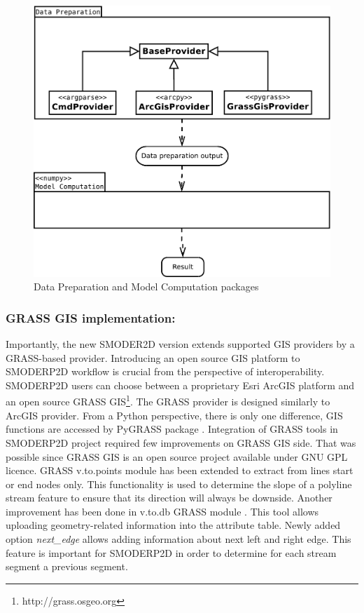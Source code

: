 \begin{figure}[ht!]
  \begin{center}
    \includegraphics[width=1.0\columnwidth]{figures/uml_diagram.pdf}
    \caption{Data Preparation and Model Computation packages}
    \label{fig:uml_diagram}
  \end{center}
\end{figure}

\subsubsection{GRASS GIS implementation:}
Importantly, the new SMODER2D version extends supported GIS providers
by a GRASS-based provider. Introducing an open source GIS platform to
SMODERP2D workflow is crucial from the perspective of
interoperability. SMODERP2D users can choose between a proprietary
Esri ArcGIS platform and an open source GRASS
GIS\footnote{http://grass.osgeo.org}. The GRASS provider is designed
similarly to ArcGIS provider. From a Python perspective, there is only
one difference, GIS functions are accessed by PyGRASS package
\cite{ijgi2010201}. Integration of GRASS tools in SMODERP2D project
required few improvements on GRASS GIS side. That was possible since
GRASS GIS is an open source project available under GNU GPL
licence. GRASS v.to.points module \cite{v-to-points-2019} has been
extended to extract from lines start or end nodes only. This
functionality is used to determine the slope of a polyline stream
feature to ensure that its direction will always be downside. Another
improvement has been done in v.to.db GRASS module
\cite{v-to-db-2019}. This tool allows uploading geometry-related
information into the attribute table. Newly added option {\it next\_edge}
allows adding information about next left and right edge. This feature
is important for SMODERP2D in order to determine for each stream
segment a previous segment.

